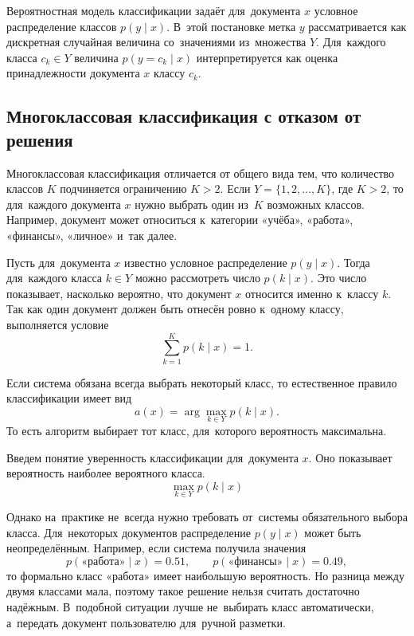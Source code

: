 Вероятностная модель классификации задаёт для~документа \( x \)
условное распределение классов \( p(y \mid x) \). В~этой постановке метка
\( y \) рассматривается как дискретная случайная величина со~значениями
из~множества \( Y \). Для~каждого класса \( c_k \in Y \) величина
\( p(y = c_k \mid x) \) интерпретируется как оценка принадлежности документа
\( x \) классу \( c_k \).

\subsection{Многоклассовая классификация с отказом от решения}\label{subsec:ch1/classification/multiclass}\label{sec/multitask}

Многоклассовая классификация отличается от общего вида тем, что количество классов \( K \)
подчиняется ограничению \( K > 2 \). Если \( Y = \{1, 2, \ldots, K\} \),
где \( K > 2 \), то для~каждого документа \( x \) нужно выбрать один из~\( K \)
возможных классов. Например, документ может относиться к~категории «учёба»,
«работа», «финансы», «личное» и~так далее.

Пусть для~документа \( x \) известно условное распределение \( p(y \mid x) \).
Тогда для~каждого класса \( k \in Y \) можно рассмотреть число \( p(k \mid x) \).
Это число показывает, насколько вероятно, что документ \( x \) относится именно
к~классу \( k \). Так как один документ должен быть отнесён ровно к~одному
классу, выполняется условие
\begin{equation}
    \label{eq:equation4}
    \sum_{k=1}^{K} p(k \mid x) = 1.
\end{equation}

Если система обязана всегда выбрать некоторый класс, то естественное правило
классификации имеет вид
\begin{equation}
    \label{eq:equation5}
    a(x) = \arg\max_{k \in Y} p(k \mid x).
\end{equation}
То есть алгоритм выбирает тот класс, для~которого вероятность максимальна.

Введем понятие уверенность классификации для~документа \( x \). Оно
показывает вероятность наиболее вероятного класса.
\begin{equation}
    \label{eq:class_confidence}
    \max_{k \in Y} p(k \mid x)
\end{equation}

Однако на~практике не~всегда нужно требовать от~системы обязательного выбора
класса. Для~некоторых документов распределение \( p(y \mid x) \) может быть
неопределённым. Например, если система получила значения
\begin{equation}
    \label{eq:equation7}
    p(\text{«работа»} \mid x) = 0.51,
    \qquad
    p(\text{«финансы»} \mid x) = 0.49,
\end{equation}
то формально класс «работа» имеет наибольшую вероятность. Но разница между
двумя классами мала, поэтому такое решение нельзя считать достаточно надёжным.
В~подобной ситуации лучше не~выбирать класс автоматически, а~передать документ
пользователю для~ручной разметки.

